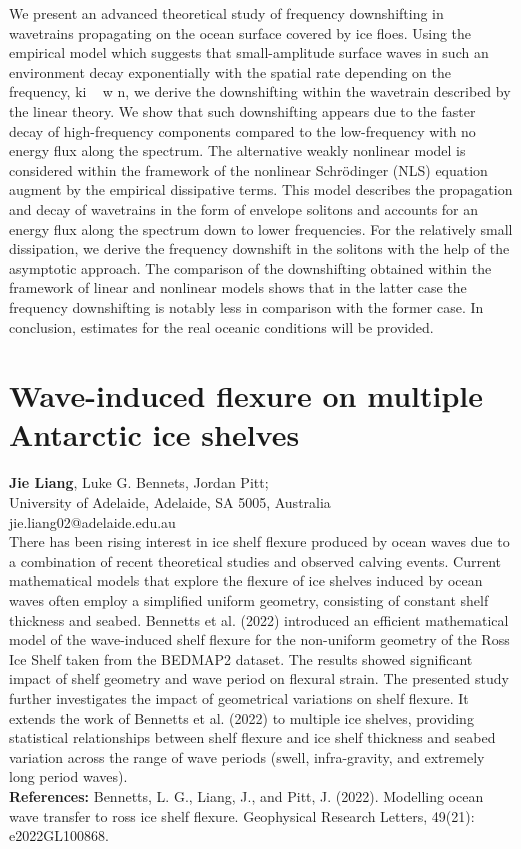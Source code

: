 \documentclass[9pt,a4paper,oneside]{book}
\numberwithin{equation}{section}
\begin{document}
We present an advanced theoretical study of frequency downshifting in wavetrains propagating on the ocean surface covered by ice floes. Using the empirical model which suggests that small-amplitude surface waves in such an environment decay exponentially with the spatial rate depending on the frequency, ki ~ w n, we derive the downshifting within the wavetrain described by the linear theory. We show that such downshifting appears due to the faster decay of high-frequency components compared to the low-frequency with no energy flux along the spectrum. The alternative weakly nonlinear model is considered within the framework of the nonlinear Schrödinger (NLS) equation augment by the empirical dissipative terms. This model describes the propagation and decay of wavetrains in the form of envelope solitons and accounts for an energy flux along the spectrum down to lower frequencies. For the relatively small dissipation, we derive the frequency downshift in the solitons with the help of the asymptotic approach. The comparison of the downshifting obtained within the framework of linear and nonlinear models shows that in the latter case the frequency downshifting is notably less in comparison with the former case. In conclusion, estimates for the real oceanic conditions will be provided.

\section*{Wave-induced flexure on multiple Antarctic ice shelves}
 \label{abs:6}
  {\bf Jie Liang}, Luke G. Bennets, Jordan Pitt;\\
University of Adelaide, Adelaide, SA 5005, Australia\\
jie.liang02@adelaide.edu.au\\

There has been rising interest in ice shelf flexure produced by ocean waves due to a combination of recent theoretical studies and observed calving events. Current mathematical models that explore the flexure of ice shelves induced by ocean waves often employ a simplified uniform geometry, consisting of constant shelf thickness and seabed. Bennetts et al. (2022) introduced an efficient mathematical model of the wave-induced shelf flexure for the non-uniform geometry of the Ross Ice Shelf taken from the BEDMAP2 dataset. The results showed significant impact of shelf geometry and wave period on flexural strain. 
The presented study further investigates the impact of geometrical variations on shelf flexure. It extends the work of Bennetts et al. (2022) to multiple ice shelves, providing statistical relationships between shelf flexure and ice shelf thickness and seabed variation across the range of wave periods (swell, infra-gravity, and extremely long period waves).\\
\textbf{References:}
Bennetts, L. G., Liang, J., and Pitt, J. (2022). Modelling ocean wave transfer to ross ice shelf flexure. Geophysical Research Letters, 49(21): e2022GL100868.
\end{document}
